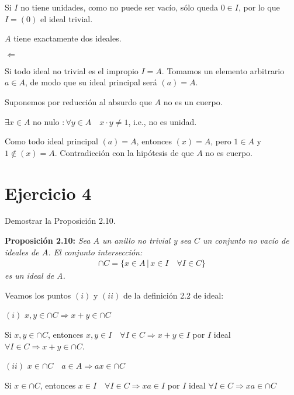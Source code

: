 \documentclass[10pt,a4paper]{article}
\begin{document}
\begin{enumerate}[(i)]
		Si $I$ no tiene unidades, como no puede ser vacío, sólo queda $0 \in I$, por lo que $I = (0)$ el ideal trivial.
		
		$A$ tiene exactamente dos ideales.
		
				
		\hfill
		
		
		$\Leftarrow$
		
		Si todo ideal no trivial es el impropio $I=A$. Tomamos un elemento arbitrario $a \in A$, de modo que su ideal principal será $(a) = A$.
		
		Suponemos por reducción al absurdo que $A$ no es un cuerpo.
		
		$\exists x \in A$ no nulo $\colon \forall y \in A \quad x\cdot y \neq 1$, i.e., no es unidad.
		
		Como todo ideal principal $(a) = A$, entonces $(x) = A$, pero $1 \in A$ y $1 \notin (x) = A$. Contradicción con la hipótesis de que $A$ no es cuerpo.
		
		
		\hfill
		
		
	\end{enumerate}
	
	
	
	
	
	\section{Ejercicio 4}
	
	Demostrar la Proposición 2.10.
	
	\textbf{Proposición 2.10:} \textit{Sea $A$ un anillo no trivial y sea $C$ un conjunto no vacío de ideales de $A$. El conjunto intersección:}
	\begin{gather*}
		\cap C =\{ x\in A \, \vert \, x\in I \quad \forall I \in C \} 
	\end{gather*}
	 \textit{es un ideal de A.}
	
	
	\hfill
	
	Veamos los puntos $(i)$ y $(ii)$ de la definición 2.2 de ideal:
	
	$(i)$ $x,y\in \cap C \Rightarrow x+y \in \cap C$
	
	Si $x, y \in \cap C$, entonces $x, y \in I \quad \forall I \in C \Rightarrow x+y \in I$ por $I$ ideal $\forall I \in C \Rightarrow x+y \in \cap C $.
	
	\hfill
	
	$(ii)$ $x \in \cap C \quad a \in A \Rightarrow ax \in \cap C$
	
	Si $x \in \cap C$, entonces $x \in I \quad \forall I \in C \Rightarrow xa\in I$ por $I$ ideal $\forall I \in C \Rightarrow xa \in \cap C $
	
\end{document}
